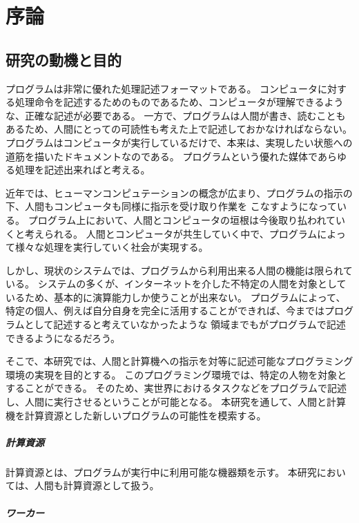 \chapter{序論}\label{chap:introduction}

\section{研究の動機と目的}\label{ux7814ux7a76ux306eux52d5ux6a5fux3068ux76eeux7684}

プログラムは非常に優れた処理記述フォーマットである。
コンピュータに対する処理命令を記述するためのものであるため、コンピュータが理解できるような、正確な記述が必要である。
一方で、プログラムは人間が書き、読むこともあるため、人間にとっての可読性も考えた上で記述しておかなければならない。
プログラムはコンピュータが実行しているだけで、本来は、実現したい状態への道筋を描いたドキュメントなのである。
プログラムという優れた媒体であらゆる処理を記述出来ればと考える。

近年では、ヒューマンコンピュテーションの概念が広まり、プログラムの指示の下、人間もコンピュータも同様に指示を受け取り作業を
こなすようになっている。
プログラム上において、人間とコンピュータの垣根は今後取り払われていくと考えられる。
人間とコンピュータが共生していく中で、プログラムによって様々な処理を実行していく社会が実現する。

しかし、現状のシステムでは、プログラムから利用出来る人間の機能は限られている。
システムの多くが、インターネットを介した不特定の人間を対象としているため、基本的に演算能力しか使うことが出来ない。
プログラムによって、特定の個人、例えば自分自身を完全に活用することができれば、今まではプログラムとして記述すると考えていなかったような
領域までもがプログラムで記述できるようになるだろう。

そこで、本研究では、人間と計算機への指示を対等に記述可能なプログラミング環境の実現を目的とする。
このプログラミング環境では、特定の人物を対象とすることができる。
そのため、実世界におけるタスクなどをプログラムで記述し、人間に実行させるということが可能となる。
本研究を通して、人間と計算機を計算資源とした新しいプログラムの可能性を模索する。

\paragraph{計算資源}\label{ux8a08ux7b97ux8cc7ux6e90}

計算資源とは、プログラムが実行中に利用可能な機器類を示す。
本研究においては、人間も計算資源として扱う。

\paragraph{ワーカー}\label{ux30efux30fcux30abux30fc}

